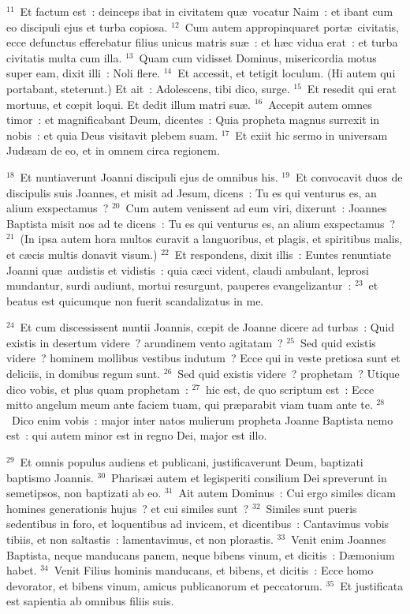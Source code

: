 ${}^{11}$~Et factum est~: deinceps ibat in civitatem qu\ae\ vocatur Naim~: et ibant cum eo discipuli ejus et turba copiosa.
${}^{12}$~Cum autem appropinquaret port\ae\ civitatis, ecce defunctus efferebatur filius unicus matris su\ae~: et h\ae c vidua erat~: et turba civitatis multa cum illa.
${}^{13}$~Quam cum vidisset Dominus, misericordia motus super eam, dixit illi~: Noli flere.
${}^{14}$~Et accessit, et tetigit loculum. (Hi autem qui portabant, steterunt.) Et ait~: Adolescens, tibi dico, surge.
${}^{15}$~Et resedit qui erat mortuus, et cœpit loqui. Et dedit illum matri su\ae .
${}^{16}$~Accepit autem omnes timor~: et magnificabant Deum, dicentes~: Quia propheta magnus surrexit in nobis~: et quia Deus visitavit plebem suam.
${}^{17}$~Et exiit hic sermo in universam Jud\ae am de eo, et in omnem circa regionem.


${}^{18}$~Et nuntiaverunt Joanni discipuli ejus de omnibus his.
${}^{19}$~Et convocavit duos de discipulis suis Joannes, et misit ad Jesum, dicens~: Tu es qui venturus es, an alium exspectamus~?
${}^{20}$~Cum autem venissent ad eum viri, dixerunt~: Joannes Baptista misit nos ad te dicens~: Tu es qui venturus es, an alium exspectamus~?
${}^{21}$~(In ipsa autem hora multos curavit a languoribus, et plagis, et spiritibus malis, et c\ae cis multis donavit visum.)
${}^{22}$~Et respondens, dixit illis~: Euntes renuntiate Joanni qu\ae\ audistis et vidistis~: quia c\ae ci vident, claudi ambulant, leprosi mundantur, surdi audiunt, mortui resurgunt, pauperes evangelizantur~:
${}^{23}$~et beatus est quicumque non fuerit scandalizatus in me.


${}^{24}$~Et cum discessissent nuntii Joannis, cœpit de Joanne dicere ad turbas~: Quid existis in desertum videre~? arundinem vento agitatam~?
${}^{25}$~Sed quid existis videre~? hominem mollibus vestibus indutum~? Ecce qui in veste pretiosa sunt et deliciis, in domibus regum sunt.
${}^{26}$~Sed quid existis videre~? prophetam~? Utique dico vobis, et plus quam prophetam~:
${}^{27}$~hic est, de quo scriptum est~: Ecce mitto angelum meum ante faciem tuam, qui pr\ae parabit viam tuam ante te.
${}^{28}$~Dico enim vobis~: major inter natos mulierum propheta Joanne Baptista nemo est~: qui autem minor est in regno Dei, major est illo.


${}^{29}$~Et omnis populus audiens et publicani, justificaverunt Deum, baptizati baptismo Joannis.
${}^{30}$~Pharis\ae i autem et legisperiti consilium Dei spreverunt in semetipsos, non baptizati ab eo.
${}^{31}$~Ait autem Dominus~: Cui ergo similes dicam homines generationis hujus~? et cui similes sunt~?
${}^{32}$~Similes sunt pueris sedentibus in foro, et loquentibus ad invicem, et dicentibus~: Cantavimus vobis tibiis, et non saltastis~: lamentavimus, et non plorastis.
${}^{33}$~Venit enim Joannes Baptista, neque manducans panem, neque bibens vinum, et dicitis~: D\ae monium habet.
${}^{34}$~Venit Filius hominis manducans, et bibens, et dicitis~: Ecce homo devorator, et bibens vinum, amicus publicanorum et peccatorum.
${}^{35}$~Et justificata est sapientia ab omnibus filiis suis.


